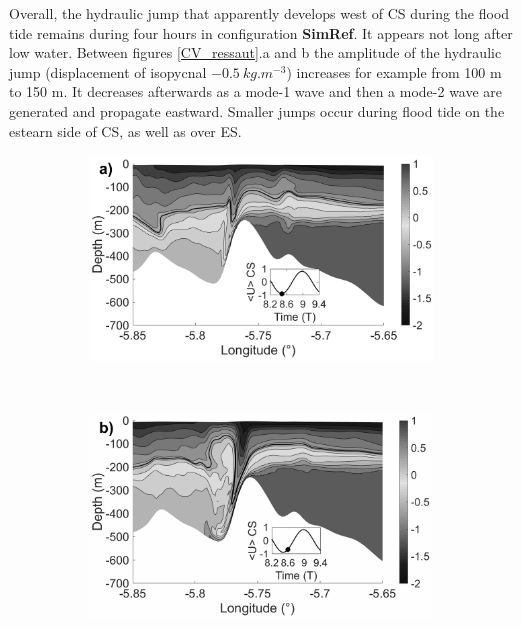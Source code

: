 \documentclass[a4paper,12pt]{article}
\begin{document}
Overall, the hydraulic jump that apparently develops west of CS during the flood tide remains during four hours in configuration \textbf{SimRef}. It appears not long after low water. Between figures \ref{CV_ressaut}.a and b the amplitude of the hydraulic jump (displacement of isopycnal $-0.5\ kg.m^{-3}$) increases for example from 100 m to 150 m. It decreases afterwards as a mode-1 wave and then a mode-2 wave are generated and propagate eastward. Smaller jumps occur during flood tide on the estearn side of CS, as well as over ES. \\


\begin{figure}[!h]
\begin{subfigure}{0.5\linewidth}
\includegraphics[width=\textwidth]{RW_J4_9h12_ref.png}
\end{subfigure}
 ~
\begin{subfigure}{0.5\linewidth}
  \includegraphics[width=\textwidth]{RW_J4_10h36_ressautebb.png}

\end{subfigure}
 

\end{figure}
\end{document}
